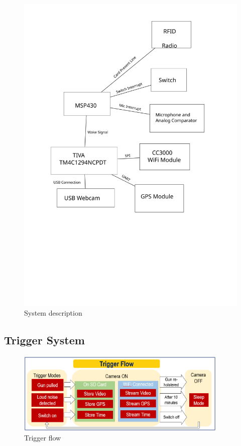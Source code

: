 \documentclass[12pt]{article}
\begin{document}
\begin{figure}[h]
    \centering
    \includegraphics[height=0.5\textheight]{sys_desc}
    \caption{System description}
    \label{fig:system_description}
\end{figure}

\subsection{Trigger System}
\label{sec:sys_trigger}

\begin{figure}[h]
    \centering
    \includegraphics[width=0.9\textwidth]{trigger_flow}
    \caption{Trigger flow}
    \label{fig:trigger_flow}
\end{figure}
\end{document}
